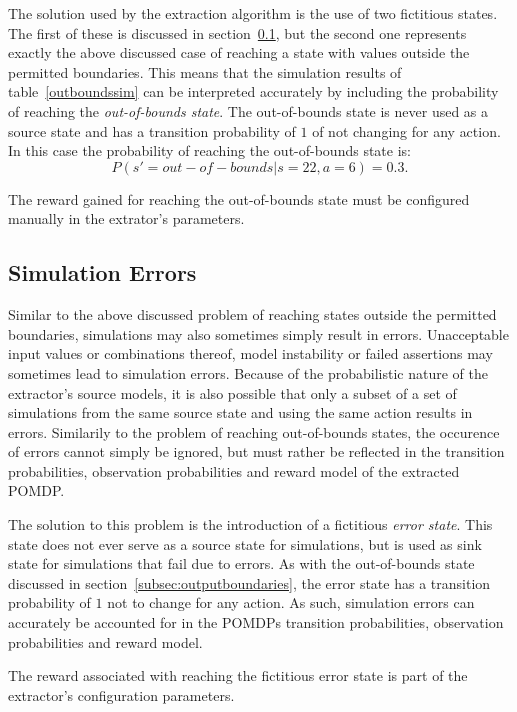 The solution used by the extraction algorithm is the use of two fictitious states. The first of these is discussed in section~\ref{subsec:simerrors}, but the second one represents exactly the above discussed case of reaching a state with values outside the permitted boundaries. This means that the simulation results of table~\ref{outboundssim} can be interpreted accurately by including the probability of reaching the \textit{out-of-bounds state}. The out-of-bounds state is never used as a source state and has a transition probability of $1$ of not changing for any action. In this case the probability of reaching the out-of-bounds state is:
\[
P(s' = out-of-bounds|s=22,a=6) = 0.3.
\]

The reward gained for reaching the out-of-bounds state must be configured manually in the extrator's parameters.


\subsection{Simulation Errors}
\label{subsec:simerrors}

Similar to the above discussed problem of reaching states outside the permitted boundaries, simulations may also sometimes simply result in errors. Unacceptable input values or combinations thereof, model instability or failed assertions may sometimes lead to simulation errors. Because of the probabilistic nature of the extractor's source models, it is also possible that only a subset of a set of simulations from the same source state and using the same action results in errors. Similarily to the problem of reaching out-of-bounds states, the occurence of errors cannot simply be ignored, but must rather be reflected in the transition probabilities, observation probabilities and reward model of the extracted POMDP.

The solution to this problem is the introduction of a fictitious \textit{error state}. This state does not ever serve as a source state for simulations, but is used as sink state for simulations that fail due to errors. As with the out-of-bounds state discussed in section~\ref{subsec:outputboundaries}, the error state has a transition probability of $1$ not to change for any action. As such, simulation errors can accurately be accounted for in the POMDPs transition probabilities, observation probabilities and reward model.

The reward associated with reaching the fictitious error state is part of the extractor's configuration parameters.

